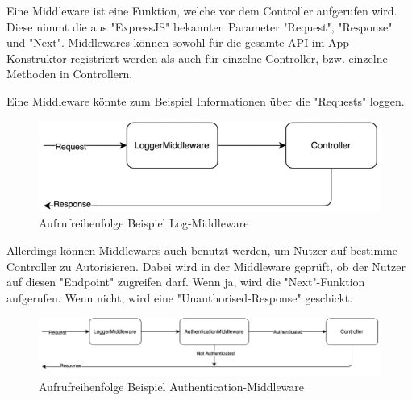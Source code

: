 
Eine Middleware ist eine Funktion, welche vor dem Controller aufgerufen wird. Diese nimmt die aus "ExpressJS" bekannten Parameter "Request", "Response" und "Next". Middlewares können sowohl für die gesamte API im App-Konstruktor registriert werden als auch für einzelne Controller, bzw. einzelne Methoden in Controllern.

Eine Middleware könnte zum Beispiel Informationen über die "Requests" loggen. 

\begin{figure}[h]
    \centering
    \includegraphics{media/APITemplate/LogMiddleware.png}
    \caption{Aufrufreihenfolge Beispiel Log-Middleware} 
\end{figure}

Allerdings können Middlewares auch benutzt werden, um Nutzer auf bestimme Controller zu Autorisieren. Dabei wird in der Middleware geprüft, ob der Nutzer auf diesen "Endpoint" zugreifen darf. Wenn ja, wird die "Next"-Funktion aufgerufen. Wenn nicht, wird eine "Unauthorised-Response" geschickt.

\begin{figure}[h]
    \centering
    \includegraphics{media/APITemplate/AuthMiddleware.png}
    \caption{Aufrufreihenfolge Beispiel Authentication-Middleware} 
\end{figure}